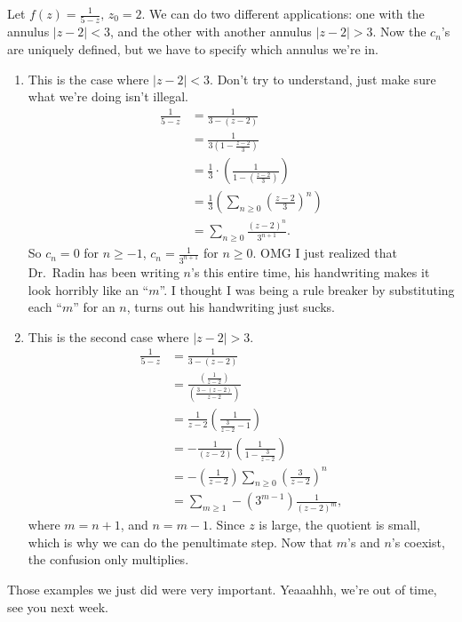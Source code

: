 \begin{example}[Important!]
    Let $f(z)=\frac{1}{5-z},\, z_0=2$. We can do two different applications: one with the annulus $|z-2|<3$, and the other with another annulus $|z-2|>3$. Now the $c_n $'s are uniquely defined, but we have to specify which annulus we're in.
    \begin{enumerate}
        \item This is the case where $|z-2|<3$. Don't try to understand, just make sure what we're doing isn't illegal. 
            \begin{align*}
                \frac{1}{5-z}&= \frac{1}{3-(z-2)}\\
                             &=\frac{1}{3\left( 1-\frac{z-2}{3} \right) }\\
                             &=\frac{1}{3}\cdot \left( \frac{1}{1-\left( \frac{z-2}{3} \right) } \right) \\
                             &=\frac{1}{3}\left( \sum_{n\geq 0}^{} \left( \frac{z-2}{3} \right) ^n  \right) \\
                             &=\sum_{n\geq 0}^{} \frac{(z-2)^n }{3^{n+1}}.
            \end{align*}
            So $c_n =0$ for $n\geq -1$, $c_n =\frac{1}{3^{n+1}}$ for $n\geq 0$. OMG I just realized that Dr.\ Radin has been writing $n$'s this entire time, his handwriting makes it look horribly like an ``$m$''. I thought I was being a rule breaker by substituting each ``$m$'' for an $n$, turns out his handwriting just sucks.
        \item This is the second case where $|z-2|>3$.
            \begin{align*}
                \frac{1}{5-z}&=\frac{1}{3-(z-2)}\\
                             &=\frac{\left( \frac{1}{z-2} \right) }{\left( \frac{3-(z-2)}{z-2} \right) }\\
                             &=\frac{1}{z-2}\left( \frac{1}{\frac{3}{z-2}-1} \right) \\ 
                             &=-\frac{1}{(z-2)}\left( \frac{1}{1-\frac{3}{z-2}} \right) \\
                             &=-\left( \frac{1}{z-2} \right) \sum_{n\geq 0}^{} \left( \frac{3}{z-2} \right) ^n \\
                             &=\sum_{m\geq 1}^{} -(3^{m-1})\frac{1}{(z-2)^m},
            \end{align*} where $m=n+1$, and $n=m-1$. Since $z$ is large, the quotient is small, which is why we can do the penultimate step. Now that $m$'s and $n$'s coexist, the confusion only multiplies.
    \end{enumerate}
\end{example}
Those examples we just did were very important. Yeaaahhh, we're out of time, see you next week.


